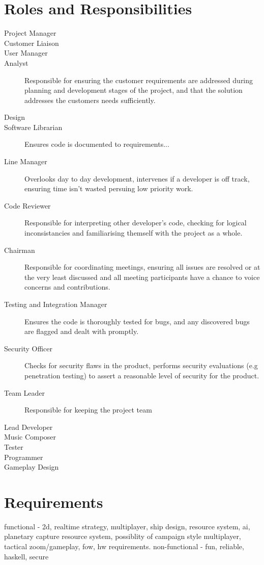 \section{Roles and Responsibilities}
\begin{description}
\item[Project Manager]
\item[Customer Liaison]
\item[User Manager]
\item[Analyst] Responsible for ensuring the customer requirements are addressed during planning and development stages of the project, and that the solution addresses the customers needs sufficiently.
\item[Design]
\item[Software Librarian] Ensures code is documented to requirements...
\item[Line Manager] Overlooks day to day development, intervenes if a developer is off track, ensuring time isn't wasted persuing low priority work.
\item[Code Reviewer] Responsible for interpreting other developer's code, checking for logical inconsistancies and familiarising themself with the project as a whole.
\item[Chairman] Responsible for coordinating meetings, ensuring all issues are resolved or at the very least discussed and all meeting participants have a chance to voice concerns and contributions.
\item[Testing and Integration Manager] Ensures the code is thoroughly tested for bugs, and any discovered bugs are flagged and dealt with promptly. 
\item[Security Officer] Checks for security flaws in the product, performs security evaluations (e.g penetration testing) to assert a reasonable level of security for the product.
\item[Team Leader] Responsible for keeping the project team 
\item[Lead Developer]
\item[Music Composer]
\item[Tester] 
\item[Programmer]
\item[Gameplay Design]
\end{description}

\section{Requirements}
functional - 2d, realtime strategy, multiplayer, ship design, resource system, ai, planetary capture resource system, possiblity of campaign style multiplayer, tactical zoom/gameplay, fow, hw requirements.
non-functional - fun, reliable, haskell, secure  

